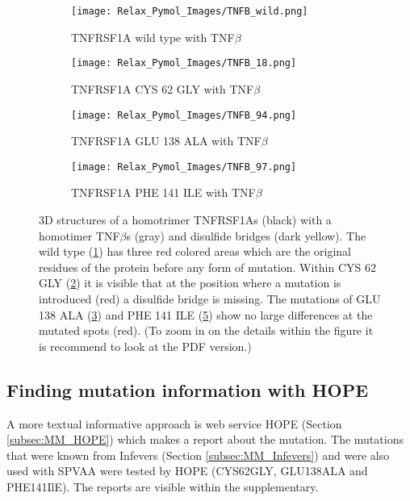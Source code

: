 		\begin{figure}[!ht]
		\centering
		\begin{subfigure}{0.49\textwidth}
			\texttt{[image: Relax\_Pymol\_Images/TNFB\_wild.png]}
			\caption{TNFRSF1A wild type with TNF$\beta$}
			\label{fig:RES_TNFB_wild}
		\end{subfigure}
		\begin{subfigure}{0.49\textwidth}
			\texttt{[image: Relax\_Pymol\_Images/TNFB\_18.png]}
			\caption{TNFRSF1A CYS 62 GLY with TNF$\beta$}
			\label{fig:RES_TNFB_18}
		\end{subfigure}
		\par\bigskip
		\begin{subfigure}{0.49\textwidth}
			\texttt{[image: Relax\_Pymol\_Images/TNFB\_94.png]}
			\caption{TNFRSF1A GLU 138 ALA with TNF$\beta$}
			\label{fig:RES_TNFB_94}
		\end{subfigure}
		\begin{subfigure}{0.49\textwidth}
			\texttt{[image: Relax\_Pymol\_Images/TNFB\_97.png]}
			\caption{TNFRSF1A PHE 141 ILE with TNF$\beta$}
			\label{fig:RES_TNFB_97}
		\end{subfigure}
	\caption[TNFRSF1A homotrimer with TNF$\beta$ homo trimers wild type and mutated relaxed models]{3D structures of a homotrimer TNFRSF1As (black) with a homotimer TNF$\beta$s (gray) and disulfide bridges (dark yellow). The wild type (\ref{fig:RES_TNFB_wild}) has three red colored areas which are the original residues of the protein before any form of mutation. Within CYS 62 GLY (\ref{fig:RES_TNFB_18}) it is visible that at the position where a mutation is introduced (red) a disulfide bridge is missing. The mutations of GLU 138 ALA (\ref{fig:RES_TNFB_94}) and PHE 141 ILE (\ref{fig:RES_TNFB_97}) show no large differences at the mutated spots (red). (To zoom in on the details within the figure it is recommend to look at the PDF version.)}
	\end{figure}
	
\newpage

\subsection{Finding mutation information with HOPE}
	A more textual informative approach is web service HOPE (Section \ref{subsec:MM_HOPE}) which makes a report about the mutation. The mutations that were known from Infevers (Section \ref{subsec:MM_Infevers}) and were also used with SPVAA were tested by HOPE (CYS62GLY, GLU138ALA and PHE141IlE). The reports are visible within the supplementary.
	
